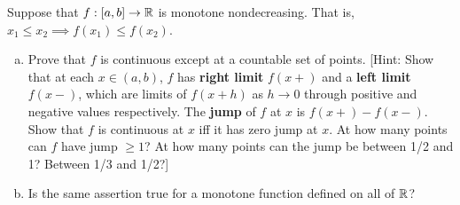 \documentclass[a4paper, 11pt]{article}
\begin{document}
\begin{problem} [1.31*]
Suppose that $f: [a, b] \to \mathbb{R}$ is monotone nondecreasing. That is, $x_1 \leq x_2 \implies f(x_1) \leq f(x_2)$.

\begin{enumerate} [(a)]
    \item Prove that $f$ is continuous except at a countable set of points. [Hint: Show that at each $x \in (a, b)$, $f$ has \textbf{right limit} $f(x+)$ and a \textbf{left limit} $f(x-)$, which are limits of $f(x + h)$ as $h \to 0$ through positive and negative values respectively. The \textbf{jump} of $f$ at $x$ is $f(x+) - f(x-)$. Show that $f$ is continuous at $x$ iff it has zero jump at $x$. At how many points can $f$ have jump $\geq 1$? At how many points can the jump be between 1/2 and 1? Between 1/3 and 1/2?]
    \item Is the same assertion true for a monotone function defined on all of $\mathbb{R}$?
\end{enumerate}
\end{problem}
\end{document}

